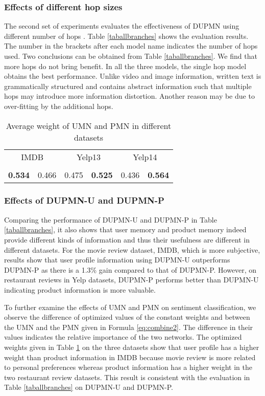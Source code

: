 \documentclass[11pt,a4paper]{article}
\begin{document}
\subsubsection*{Effects of different hop sizes}
The second set of experiments evaluates the effectiveness of DUPMN using different number of hops . Table \ref{taballbranches} shows the evaluation results. The number in the brackets after each model name indicates the number of hops used. Two conclusions can be obtained from Table \ref{taballbranches}. We find that more hops do not bring benefit. In all the three models, the single hop model obtains the best performance. Unlike video and image information, written text is grammatically structured and contains abstract information such that multiple hops may introduce more information distortion. Another reason may be due to over-fitting by the additional hops. 

\begin{table}[ht]
\centering
\begin{tabular}{c|c|c|c|c|c}
\hline
\multicolumn{2}{c|}{IMDB} & \multicolumn{2}{c|}{Yelp13} & \multicolumn{2}{c}{Yelp14} \\ \cline{1-6}
        			\small{}&\small{}&\small{}&\small{}&\small{}&\small{} \\ \hline \hline
                    \textbf{0.534} & 0.466 & 0.475 & \textbf{0.525} & 0.436 & \textbf{0.564} \\ \hline 
                    \end{tabular}
                    \caption{Average weight of UMN and PMN in different datasets}
                    \label{tab:combine_weight}
\end{table}

\subsubsection*{Effects of DUPMN-U and DUPMN-P}
Comparing the performance of DUPMN-U and DUPMN-P in Table \ref{taballbranches}, it also shows that user memory and product memory indeed provide different kinds of information and thus their usefulness are different in different datasets. For the movie review dataset, IMDB, which is more subjective, results show that user profile information using DUPMN-U outperforms DUPMN-P as there is a 1.3\% gain compared to that of DUPMN-P. However, on restaurant reviews in Yelp datasets, DUPMN-P performs better than DUPMN-U indicating product information is more valuable.

To further examine the effects of UMN and PMN on sentiment classification, we observe the difference of optimized values of the constant weights  and  between the UMN and the PMN given in Formula \ref{eq:combine2}. The difference in their values indicates the relative importance of the two networks. The optimized weights given in Table \ref{tab:combine_weight} on the three datasets show that user profile has a higher weight than product information in IMDB because movie review is more related to personal preferences whereas product information has a higher weight in the two restaurant review datasets. This result is consistent with the evaluation in Table \ref{taballbranches} on DUPMN-U and DUPMN-P.
\end{document}
